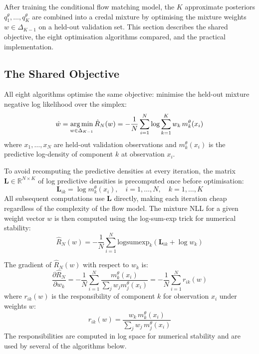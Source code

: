 After training the conditional flow 
matching model, the $K$ approximate 
posteriors $q^\theta_1, \ldots, 
q^\theta_K$ are combined into a credal 
mixture by optimising the mixture 
weights $w \in \Delta_{K-1}$ on a 
held-out validation set. This section 
describes the shared objective, the 
eight optimisation algorithms compared, 
and the practical implementation.

\subsection{The Shared Objective}

All eight algorithms optimise the same 
objective: minimise the held-out mixture 
negative log likelihood over the simplex:
\begin{equation}
    \hat{w} = \operatorname*{arg\,min}_{w \in \Delta_{K-1}} 
    \hat{R}_N(w) = -\frac{1}{N} 
    \sum_{i=1}^N \log \sum_{k=1}^K 
    w_k\, m^\theta_k(x_i)
    \label{eq:weight_obj}
\end{equation}
where $x_1, \ldots, x_N$ are held-out 
validation observations and $m^\theta_k(x_i)$ 
is the predictive log-density of component 
$k$ at observation $x_i$.

To avoid recomputing the predictive 
densities at every iteration, the matrix 
$\mathbf{L} \in \mathbb{R}^{N \times K}$ 
of log predictive densities is 
precomputed once before optimisation:
\begin{equation}
    \mathbf{L}_{ik} = \log m^\theta_k(x_i), 
    \quad i = 1, \ldots, N, 
    \quad k = 1, \ldots, K
    \label{eq:logpk}
\end{equation}
All subsequent computations use 
$\mathbf{L}$ directly, making each 
iteration cheap regardless of the 
complexity of the flow model. The 
mixture NLL for a given weight vector 
$w$ is then computed using the 
log-sum-exp trick for numerical 
stability:
\begin{equation}
    \hat{R}_N(w) = -\frac{1}{N} 
    \sum_{i=1}^N \mathrm{logsumexp}_k
    \left(\mathbf{L}_{ik} + \log w_k
    \right)
    \label{eq:nll_logsumexp}
\end{equation}

The gradient of $\hat{R}_N(w)$ with 
respect to $w_k$ is:
\begin{equation}
    \frac{\partial \hat{R}_N}{\partial w_k} 
    = -\frac{1}{N} \sum_{i=1}^N 
    \frac{m^\theta_k(x_i)}
    {\sum_j w_j m^\theta_j(x_i)}
    = -\frac{1}{N} \sum_{i=1}^N r_{ik}(w)
    \label{eq:nll_gradient}
\end{equation}
where $r_{ik}(w)$ is the responsibility 
of component $k$ for observation $x_i$ 
under weights $w$:
\begin{equation}
    r_{ik}(w) = \frac{w_k\, 
    m^\theta_k(x_i)}{\sum_j w_j\, 
    m^\theta_j(x_i)}
    \label{eq:responsibilities}
\end{equation}
The responsibilities are computed in 
log space for numerical stability and 
are used by several of the algorithms 
below.


